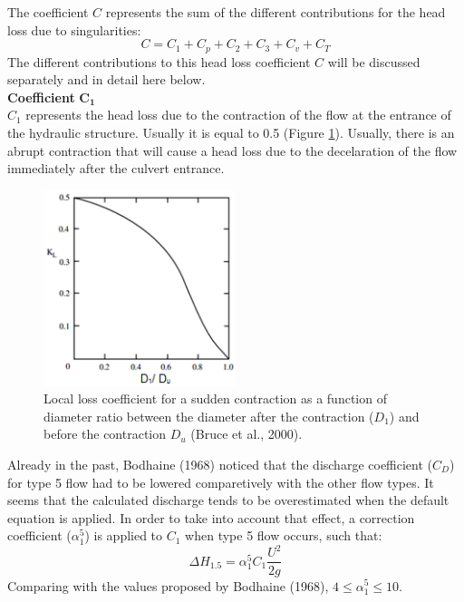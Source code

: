 The coefficient $C$ represents the sum of the different contributions for the
head loss due to singularities:
\begin{equation}
C=C_1+C_p+C_2+C_3+C_v+C_T
\end{equation}
The different contributions to this head loss coefficient $C$ will be discussed
separately and in detail here below.\\

\textbf{Coefficient} $\mathbf{C_1}$ \\
$C_1$ represents the head loss due to the contraction of the flow at the entrance
of the hydraulic structure.
Usually it is equal to 0.5 (Figure \ref{fig:culvert_fig7}).
Usually, there is an abrupt contraction that will cause a head loss due to
the decelaration of the flow immediately after the culvert entrance.

\begin{figure}[H]
\begin{center}
  \includegraphics[width=0.5\textwidth]{culvert_fig7.png}
\end{center}
\caption{Local loss coefficient for a sudden contraction as
a function of diameter ratio between the diameter after the contraction ($D_1$)
and before the contraction $D_u$ (Bruce et al., 2000).}
\label{fig:culvert_fig7}
\end{figure}

Already in the past, Bodhaine (1968) noticed that the discharge coefficient ($C_D$)
for type 5 flow had to be lowered comparetively with the other flow types.
It seems that the calculated discharge tends to be overestimated when the
default equation is applied. In order to take into account that effect,
a correction coefficient ($\alpha_1^5$) is applied to $C_1$ when type 5 flow occurs, such that:
\begin{equation}
\Delta H_{1.5}=\alpha_1^5 C_1  \dfrac{U^2}{2g}
\end{equation}
Comparing with the values proposed by Bodhaine (1968), $4 \le \alpha_1^5 \le 10$.\\

